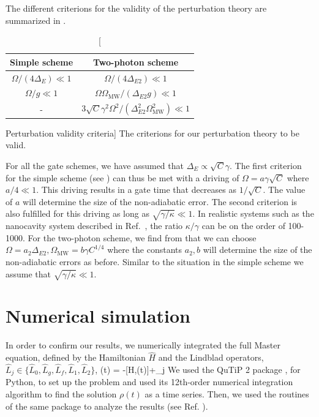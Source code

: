 The different criterions for the validity of the perturbation theory are
summarized in .
\begin{table} [H]
\centering
\begin{tabular}{|c|c|}
\hline
Simple scheme & Two-photon scheme  \\ \hline
$\Omega/(4\Delta_{E})\ll1$ & $\Omega/(4\Delta_{E2})\ll1$ \\ \hline
$\Omega/g\ll1$ & $\Omega\Omega_{\text{MW}}/(\Delta_{E2}g)\ll1$ \\ \hline
- & $3\sqrt{C}\gamma^{2}\Omega^{2}/(\Delta_{E2}^{2}\Omega_{\text{MW}}^{2})\ll1$  \\ \hline
\end{tabular}
\caption
[Perturbation validity criteria]
{The criterions for our perturbation theory to be valid. }
\label{tab:tableS1}
\end{table}
For all the gate schemes, we have assumed that
$\Delta_{E}\propto\sqrt{C}\gamma$. The first criterion for the simple scheme
(see ) can thus be met with a driving of
$\Omega=a\gamma\sqrt{C}$ where $a/4\ll1$. This driving results in a gate time
that decreases as $1/\sqrt{C}$. The value of $a$ will determine the size of the
non-adiabatic error. The second criterion is also fulfilled for this driving as
long as $\sqrt{\gamma/\kappa}\ll1$. In realistic systems such as the nanocavity
system described in Ref.~\cite{thompson, Tiecke}, the ratio $\kappa/\gamma$ can
be on the order of 100-1000.
For the two-photon scheme, we find from  that we can choose
$\Omega=a_{2}\Delta_{E2}, \Omega_{\text{MW}}=b\gamma C^{1/4}$ where the
constants $a_{2},b$ will determine the size of the non-adiabatic errors as
before. Similar to the situation in the simple scheme we assume that
$\sqrt{\gamma/\kappa}\ll1$.

\section{Numerical simulation}
In order to confirm our results, we numerically integrated the full Master
equation, defined by the Hamiltonian $\hat H$ and the Lindblad operators,
$\hat L_j \in \{\hat L_0, \hat L_g, \hat L_f, \hat L_1, \hat L_2\}$, 
\bel
\label{eq:full Master eq}
	\rho(t) = -[\hat H,\rho(t)]+\sum_j 
\eel
We used the QuTiP 2
package \cite{Johansson20131234}, for Python, to set up the problem and used its
12th-order numerical integration algorithm to find the solution $\rho(t)$ as a
time series.
Then, we used the routines of the same package to analyze the results (see Ref.
\cite{peter}).

